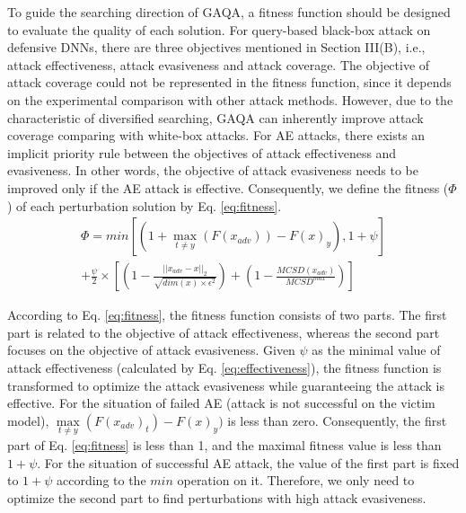 \documentclass[lettersize,journal]{IEEEtran}
\begin{document}
	To guide the searching direction of GAQA, a fitness function should be designed to evaluate the quality of each solution. For query-based black-box attack on defensive DNNs, there are three objectives mentioned in Section III(B), i.e., attack effectiveness, attack evasiveness and attack coverage. The objective of attack coverage could not be represented in the fitness function, since it depends on the experimental comparison with other attack methods. However, due to the characteristic of diversified searching, GAQA can inherently improve attack coverage comparing with white-box attacks. For AE attacks, there exists an implicit priority rule between the objectives of attack effectiveness and evasiveness. In other words, the objective of attack evasiveness needs to be improved only if the AE attack is effective.       
	Consequently, we define the fitness ($\Phi$) of each perturbation solution by Eq. \ref{eq:fitness}. 
	\begin{equation}
		\begin{split}
			\Phi = min[(1+\max\limits_{t\neq y}{(F(x_{adv}))}-F(x)_y),1+\psi]\\
			+\frac{\psi}{2}\times[(1-\frac{||x_{adv}-x||_2}{\sqrt{dim(x)\times \epsilon^2}})+(1-\frac{MCSD(x_{adv})}{MCSD^{max}})] 				
		\end{split}
		\label{eq:fitness}
	\end{equation}
	
	
	According to Eq. \ref{eq:fitness}, the fitness function consists of two parts. The first part is related to the objective of attack effectiveness, whereas the second part focuses on the objective of attack evasiveness. Given $\psi$ as the minimal value of attack effectiveness (calculated by Eq. \ref{eq:effectiveness}), the fitness function is transformed to optimize the attack evasiveness while guaranteeing the attack is effective. For the situation of failed AE (attack is not successful on the victim model), $\max\limits_{t\neq y}{(F(x_{adv})_t)}-F(x)_y)$ is less than zero. Consequently, the first part of Eq. \ref{eq:fitness} is less than 1, and the maximal fitness value is less than $1 + \psi$. For the situation of successful AE attack, the value of the first part is fixed to  $1 + \psi$ according to the $min$ operation on it. Therefore, we only need to optimize the second part to find perturbations with high attack evasiveness. 
	
	
\end{document}
